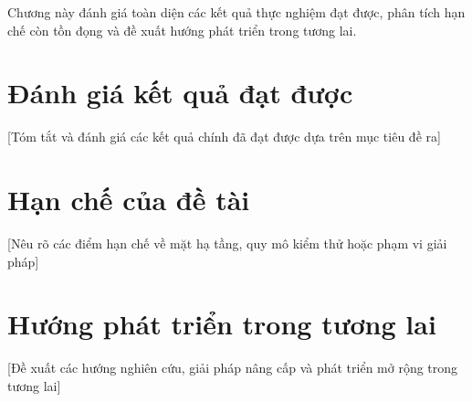 Chương này đánh giá toàn diện các kết quả thực nghiệm đạt được, phân tích hạn chế còn tồn đọng và đề xuất hướng phát triển trong tương lai.

\section{Đánh giá kết quả đạt được}
[Tóm tắt và đánh giá các kết quả chính đã đạt được dựa trên mục tiêu đề ra]

\section{Hạn chế của đề tài}
[Nêu rõ các điểm hạn chế về mặt hạ tầng, quy mô kiểm thử hoặc phạm vi giải pháp]

\section{Hướng phát triển trong tương lai}
[Đề xuất các hướng nghiên cứu, giải pháp nâng cấp và phát triển mở rộng trong tương lai]
